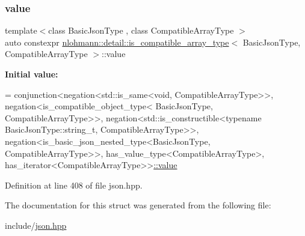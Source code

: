 \subsubsection{\texorpdfstring{value}{value}}
{\footnotesize\ttfamily template$<$class Basic\+Json\+Type , class Compatible\+Array\+Type $>$ \\
auto constexpr \hyperlink{structnlohmann_1_1detail_1_1is__compatible__array__type}{nlohmann\+::detail\+::is\+\_\+compatible\+\_\+array\+\_\+type}$<$ Basic\+Json\+Type, Compatible\+Array\+Type $>$\+::value\hspace{0.3cm}{\ttfamily [static]}}

{\bfseries Initial value\+:}
\begin{DoxyCode}
=
        conjunction<negation<std::is\_same<void, CompatibleArrayType>>,
        negation<is\_compatible\_object\_type<
        BasicJsonType, CompatibleArrayType>>,
        negation<std::is\_constructible<\textcolor{keyword}{typename} BasicJsonType::string\_t,
        CompatibleArrayType>>,
        negation<is\_basic\_json\_nested\_type<BasicJsonType, CompatibleArrayType>>,
        has\_value\_type<CompatibleArrayType>,
        has\_iterator<CompatibleArrayType>>\hyperlink{structnlohmann_1_1detail_1_1is__compatible__array__type_a01bc2274c22746bbb2cefd2acee8b572}{::value}
\end{DoxyCode}


Definition at line 408 of file json.\+hpp.



The documentation for this struct was generated from the following file\+:\begin{DoxyCompactItemize}
\item 
include/\hyperlink{json_8hpp}{json.\+hpp}\end{DoxyCompactItemize}
